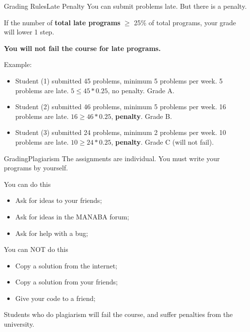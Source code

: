 \begin{frame}{Grading Rules}{Late Penalty}
  You can submit problems late. But there is a penalty.\bigskip

  If the number of {\bf total late programs} $\ge$ 25\% of total programs, your grade will lower 1 step.\bigskip

  {\bf You will not fail the course for late programs.}

  \begin{exampleblock}{Example:}
    \begin{itemize}
      \item Student (1) submitted 45 problems, minimum 5 problems per week. 5 problems are late. $5 \le 45*0.25$, no penalty. Grade A.
      \item Student (2) submitted 46 problems, minimum 5 problems per week. 16 problems are late. $16 \ge 46*0.25$, {\bf penalty}. Grade B.
      \item Student (3) submitted 24 problems, minimum 2 problems per week. 10 problems are late. $10 \ge 24*0.25$, {\bf penalty}. \alert{Grade C (will not fail)}.
    \end{itemize}
  \end{exampleblock}
\end{frame}


\begin{frame}{Grading}{Plagiarism}
  The assignments are \alert{individual}. You must write your
  programs by yourself.

  \begin{exampleblock}{You can do this}
    \begin{itemize}
    \item Ask for ideas to your friends;
    \item Ask for ideas in the MANABA forum;
    \item Ask for help with a bug;
    \end{itemize}
  \end{exampleblock}

  \begin{alertblock}{You can NOT do this}
    \begin{itemize}
    \item Copy a solution from the internet;
    \item Copy a solution from your friends;
    \item Give your code to a friend;
    \end{itemize}
  \end{alertblock}

  Students who do plagiarism will fail the course, and suffer penalties from the university.
\end{frame}

